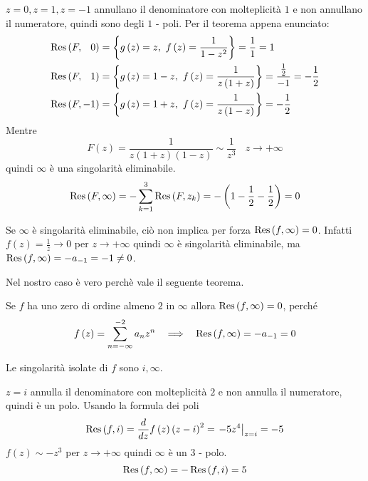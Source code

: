 $z = 0, z = 1, z = -1$ annullano il denominatore con molteplicità $1$ e non annullano il numeratore, quindi sono degli $1$ - poli. Per il teorema appena enunciato:
\begin{align*}
\Res \left(F, \phantom{-}0\right) & = \left\{g\left(z\right) =  z, \ f\left(z\right) = \frac{1}{1 - z^{2}}\right\} = \frac{1}{1} = 1\\
\Res \left(F, \phantom{-}1\right) & = \left\{g\left(z\right) = 1 - z, \ f\left(z\right) = \frac{1}{z\left(1 + z\right)}\right\} = \frac{\frac{1}{2}}{- 1} = - \frac{1}{2}\\
\Res \left(F, - 1\right) 			 & = \left\{g\left(z\right) = 1 + z, \ f\left(z\right) = \frac{1}{z\left(1 - z\right)}\right\} = - \frac{1}{2}
\end{align*}
Mentre
\begin{equation*}
F\left(z\right) = \frac{1}{z\left(1 + z\right)\left(1 - z\right)} \sim \frac{1}{z^{3}} \ \ \ \ z\rightarrow + \infty 
\end{equation*}
quindi $\infty $ è una singolarità eliminabile.
\begin{equation*}
\operatorname{Res} \left(F, \infty \right) = - \sum\limits^{3}_{k = 1}\operatorname{Res} \left(F, z_{k}\right) = - \left(1 - \frac{1}{2} - \frac{1}{2}\right) = 0
\end{equation*}
\begin{rem}
Se $\infty $ è singolarità eliminabile, ciò non implica per forza $\operatorname{Res} \left(f, \infty \right) = 0$. Infatti $f\left(z\right) = \frac{1}{z}\rightarrow 0$ per $z\rightarrow + \infty $ quindi $\infty $ è singolarità eliminabile, ma $\operatorname{Res} \left(f, \infty \right) = - a_{- 1} = - 1\neq 0$.
\end{rem}
\begin{rem}
Nel nostro caso è vero perchè vale il seguente teorema.
\end{rem}
\begin{thm}
Se $f$ ha uno zero di ordine almeno $2$ in $\infty $ allora $\operatorname{Res} \left(f, \infty \right) = 0$, perché
\begin{equation*}
f\left(z\right) = \sum\limits^{- 2}_{n = -\infty} a_{n} z^{n} \ \ \implies \ \ \operatorname{Res} \left(f, \infty \right) = - a_{- 1} = 0
\end{equation*}
\end{thm}
\Soluzione

Le singolarità isolate di $f$ sono $i, \infty $.

$z = i$ annulla il denominatore con molteplicità $2$ e non annulla il numeratore, quindi è un polo. Usando la formula dei poli
\begin{equation*}
\operatorname{Res} \left(f, i\right) = \frac{d}{dz} f\left(z\right)\left(z - i\right)^{2} = \left. - 5z^{4}\right|_{z = i} = - 5
\end{equation*}
$f\left(z\right) \sim - z^{3}$ per $z\rightarrow + \infty $ quindi $\infty $ è un $3$ - polo.
\begin{equation*}
\operatorname{Res} \left(f, \infty \right) = - \operatorname{Res} \left(f, i\right) = 5
\end{equation*}
\Soluzione

